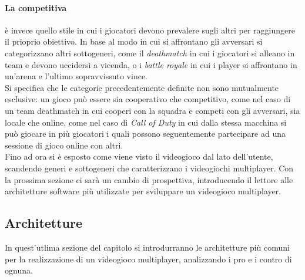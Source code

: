         \paragraph{La competitiva} è invece quello stile in cui i giocatori devono prevalere sugli altri per raggiungere il prioprio obiettivo. In base al modo in cui si affrontano
            gli avversari si categorizzano altri sottogeneri, come il \textit{deathmatch} in cui i giocatori si alleano in team e devono uccidersi a vicenda, o i \textit{battle royale}
            in cui i player si affrontano in un'arena e l'ultimo sopravvissuto vince.\\    
        
        Si specifica che le categorie precedentemente definite non sono mutualmente esclusive: un gioco può essere sia cooperativo che competitivo, come nel caso di un team deathmatch
        in cui cooperi con la squadra e competi con gli avversari, sia locale che online, come nel caso di \textit{Call of Duty} in cui dalla stessa macchina si può giocare in più giocatori
        i quali possono seguentemente partecipare ad una sessione di gioco online con altri.\\
        Fino ad ora si è esposto come viene visto il videogioco dal lato dell'utente, scandendo generi e sottogeneri che caratterizzano i videogiochi multiplayer. Con la prossima sezione
        ci sarà un cambio di prospettiva, introducendo il lettore alle architetture software più utilizzate per sviluppare un videogioco multiplayer.
    \subsection{Architetture}\label{subsec:MultiArchitetture}
        In quest'utlima sezione del capitolo si introdurranno le architetture più comuni per la realizzazione di un videogioco multiplayer, analizzando i pro e i contro di ognuna.

